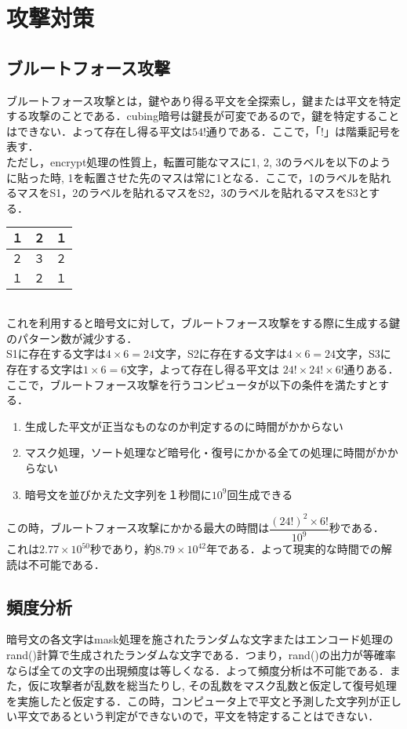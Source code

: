 \documentclass[titlepage]{jarticle}
\begin{document}
\section{攻撃対策}
\subsection{ブルートフォース攻撃}
ブルートフォース攻撃とは，鍵やあり得る平文を全探索し，鍵または平文を特定する攻撃のことである．cubing暗号は鍵長が可変であるので，鍵を特定することはできない．よって存在し得る平文は\(54!\)通りである．ここで，「\(!\)」は階乗記号を表す．\\
ただし，encrypt処理の性質上，転置可能なマスに1, 2, 3のラベルを以下のように貼った時, 1を転置させた先のマスは常に1となる．ここで，1のラベルを貼れるマスをS1，2のラベルを貼れるマスをS2，3のラベルを貼れるマスをS3とする．\\
\begin{table}[htb]
  \begin{tabular}{|l|c|r|} \hline
    １ & ２ & １ \\ \hline
    ２ & ３ & ２ \\ \hline
    １ & ２ & １ \\ \hline
  \end{tabular}
\end{table}\\
これを利用すると暗号文に対して，ブルートフォース攻撃をする際に生成する鍵のパターン数が減少する．\\
S1に存在する文字は\(4\times6=24\)文字，S2に存在する文字は\(4\times6=24\)文字，S3に存在する文字は\(1\times6=6\)文字，よって存在し得る平文は \(24!\times24!\times6!\)通りある．\\
ここで，ブルートフォース攻撃を行うコンピュータが以下の条件を満たすとする．
\begin{enumerate}
  \item 生成した平文が正当なものなのか判定するのに時間がかからない
  \item マスク処理，ソート処理など暗号化・復号にかかる全ての処理に時間がかからない
  \item 暗号文を並びかえた文字列を１秒間に\(10^9\)回生成できる
\end{enumerate}
この時，ブルートフォース攻撃にかかる最大の時間は\(\dfrac{(24!)^2\times6!}{10^9}\)秒である．\\
これは\(2.77\times10^{50}\)秒であり，約\(8.79\times10^{42}\)年である．よって現実的な時間での解読は不可能である．

\subsection{頻度分析}
暗号文の各文字はmask処理を施されたランダムな文字またはエンコード処理のrand()計算で生成されたランダムな文字である．つまり，rand()の出力が等確率ならば全ての文字の出現頻度は等しくなる．よって頻度分析は不可能である．また，仮に攻撃者が乱数を総当たりし, その乱数をマスク乱数と仮定して復号処理を実施したと仮定する．この時，コンピュータ上で平文と予測した文字列が正しい平文であるという判定ができないので，平文を特定することはできない．
\end{document}
